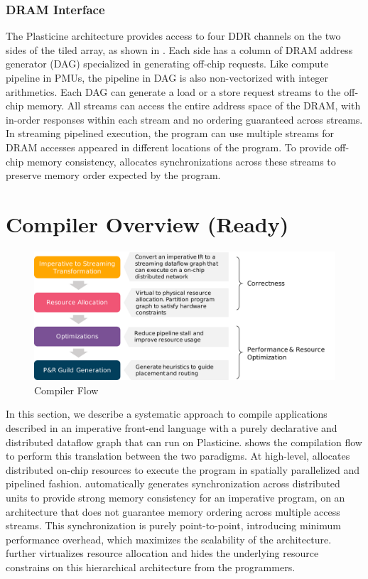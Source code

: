 \subsubsection{DRAM Interface}
The Plasticine architecture provides access to four DDR channels on the two sides of the
tiled array, as shown in . 
Each side has a column of DRAM address generator (DAG) specialized in generating off-chip
requests. Like compute pipeline in PMUs, the pipeline in DAG is also non-vectorized with integer
arithmetics. Each DAG can generate a load or a store request streams to the off-chip memory. All
streams can access the entire address space of the DRAM, with in-order responses within each stream
and no ordering guaranteed across streams. 
In streaming pipelined execution, the program can use multiple streams for DRAM accesses appeared in
different locations of the program.
To provide off-chip memory consistency, \name allocates
synchronizations across these streams to preserve memory order expected by the program.

\section{Compiler Overview (Ready)}

\begin{figure}
\centering
\includegraphics[width=1\textwidth]{figs/sarastack.pdf}
\caption[\name Compiler Flow]{\name Compiler Flow}
\label{fig:flow}
\end{figure}
 
In this section, we describe a systematic approach to compile applications described in an
imperative front-end language with a purely declarative and distributed dataflow graph that can
run on Plasticine.
 shows the compilation flow to perform this translation between the two paradigms.
At high-level, \name allocates distributed on-chip resources to execute the program in spatially parallelized and
pipelined fashion.
\name automatically generates synchronization across distributed units to provide strong memory consistency for an imperative program, on an architecture that does not guarantee memory
ordering across multiple access streams.
This synchronization is purely point-to-point, introducing minimum performance overhead, which
maximizes the scalability of the architecture.
\name further virtualizes resource allocation and hides the underlying resource constrains on
this hierarchical architecture from the programmers.

